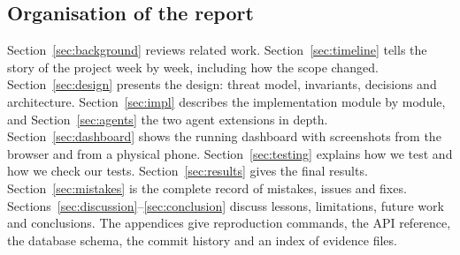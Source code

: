 \subsection{Organisation of the report}
Section~\ref{sec:background} reviews related work. Section~\ref{sec:timeline} tells the story of the project week by week, including how the scope changed. Section~\ref{sec:design} presents the design: threat model, invariants, decisions and architecture. Section~\ref{sec:impl} describes the implementation module by module, and Section~\ref{sec:agents} the two agent extensions in depth. Section~\ref{sec:dashboard} shows the running dashboard with screenshots from the browser and from a physical phone. Section~\ref{sec:testing} explains how we test and how we check our tests. Section~\ref{sec:results} gives the final results. Section~\ref{sec:mistakes} is the complete record of mistakes, issues and fixes. Sections~\ref{sec:discussion}--\ref{sec:conclusion} discuss lessons, limitations, future work and conclusions. The appendices give reproduction commands, the API reference, the database schema, the commit history and an index of evidence files.
